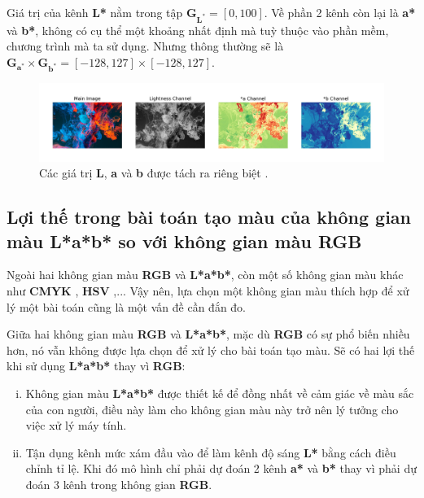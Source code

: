\documentclass[a4paper, 12pt]{report}
\begin{document}
Giá trị của kênh \textbf{L*} nằm trong tập $\mathbf{G}_{\mathbf{L}^*} = [0, 100]$.
Về phần 2 kênh còn lại là \textbf{a*} và \textbf{b*}, không có cụ thể một khoảng nhất định mà tuỳ thuộc vào phần mềm, chương trình mà ta sử dụng.
Nhưng thông thường sẽ là $\mathbf{G}_{\mathbf{a}^*} \times \mathbf{G}_{\mathbf{b}^*} = [-128, 127] \times [-128, 127]$.

\begin{figure}[!h]
\captionsetup{width=0.8\textwidth}
\centering
\includegraphics[width=16cm]{images/2_3.jpeg}
\caption{Các giá trị \textbf{L}, \textbf{a} và \textbf{b} được tách ra riêng biệt \cite{moeincolorization2020}.}
\label{fig:inspectlab}
\end{figure}

\subsection{Lợi thế trong bài toán tạo màu của không gian màu L*a*b* so với không gian màu RGB}\label{reasontopicklab}

Ngoài hai không gian màu \textbf{RGB} và \textbf{L*a*b*}, còn một số không gian màu khác như \textbf{CMYK} \cite{wikicmyk2021}, \textbf{HSV} \cite{wikihsv2021},... Vậy nên, lựa chọn một không gian màu thích hợp để xử lý một bài toán cũng là một vấn đề cần đắn đo.\vspace{5pt}

Giữa hai không gian màu \textbf{RGB} và \textbf{L*a*b*}, mặc dù \textbf{RGB} có sự phổ biến nhiều hơn, nó vẫn không được lựa chọn để xử lý cho bài toán tạo màu. Sẽ có hai lợi thế khi sử dụng \textbf{L*a*b*} thay vì \textbf{RGB}:

\begin{enumerate}[i)]
    \item Không gian màu \textbf{L*a*b*} được thiết kế để đồng nhất về cảm giác về màu sắc của con người, điều này làm cho không gian màu này trở nên lý tưởng cho việc xử lý máy tính.
    \item Tận dụng kênh mức xám đầu vào để làm kênh độ sáng \textbf{L*} bằng cách điều chỉnh tỉ lệ. Khi đó mô hình chỉ phải dự đoán 2 kênh \textbf{a*} và \textbf{b*} thay vì phải dự đoán 3 kênh trong không gian \textbf{RGB}.\label{enum:secondreason}
\end{enumerate}
\end{document}
